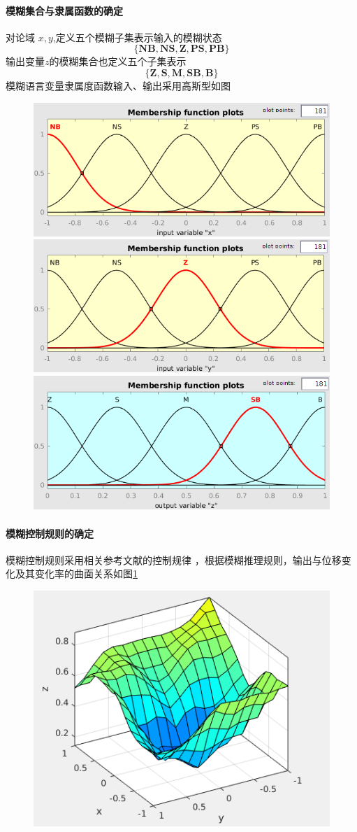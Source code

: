 \paragraph{模糊集合与隶属函数的确定}
\qquad 对论域 $x,y$,定义五个模糊子集表示输入的模糊状态
\[\mathbf{\lbrace NB,NS,Z,PS,PB\rbrace}\]
输出变量$z$的模糊集合也定义五个子集表示
\[\mathbf{\lbrace Z,S,M,SB,B\rbrace}\]
模糊语言变量隶属度函数输入、输出采用高斯型如图
\begin{figure}[H]
\centering
\includegraphics[width=0.5\linewidth]{figure/fuzzyx}
\includegraphics[width=0.5\linewidth]{figure/fuzzyy}
\includegraphics[width=0.5\linewidth]{figure/fuzzyz}
\end{figure}

\paragraph{模糊控制规则的确定}
\qquad 模糊控制规则采用相关参考文献的控制规律 ，根据模糊推理规则，输出与位移变化及其变化率的曲面关系如图\ref{fuzzysurface}
\begin{figure}[H]
\centering
{}
\label{fuzzysurface}
\includegraphics[width=0.5\linewidth]{figure/fuzzysurface}
\end{figure}


